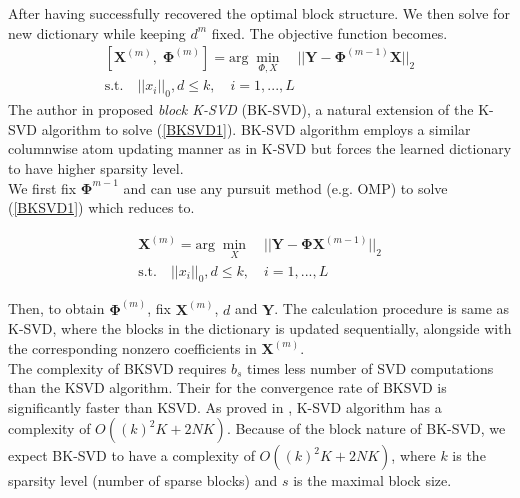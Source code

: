 After having successfully recovered the optimal block structure. We then solve for new dictionary while keeping $d^{m}$ fixed. The objective function becomes.
\begin{equation}
\begin{aligned}
    \left[\mathbf{X}^{(m)}, \;\mathbf{\Phi}^{(m)}\right] = \text{arg} \; \min_{\Phi,X} \quad || \mathbf{Y} - \mathbf{\Phi}^{(m-1)}\mathbf{X}||_2 \\
    \text{s.t.} \quad ||x_i||_0,d \leq k, \quad i = 1,...,L
\end{aligned}
\label{BKSVD1}
\end{equation}
The author in \cite{dictionary_block_sparse} proposed \textit{block K-SVD} (BK-SVD), a natural extension of the K-SVD algorithm to solve (\ref{BKSVD1}). BK-SVD algorithm employs a similar columnwise atom updating manner as in K-SVD but forces the learned dictionary to have higher sparsity level.\\

We first fix $\mathbf{\Phi}^{m-1}$ and can use any pursuit method (e.g. OMP) to solve (\ref{BKSVD1}) which reduces to.

\begin{equation}
\begin{aligned}
    \mathbf{X}^{(m)} = \text{arg} \; \min_X \quad || \mathbf{Y} - \mathbf{\Phi}\mathbf{X}^{(m-1)}||_2 \\
    \text{s.t.} \quad ||x_i||_0,d \leq k, \quad i = 1,...,L
\end{aligned}
\end{equation}

Then, to obtain $\mathbf{\Phi}^{(m)}$, fix $\mathbf{X}^{(m)}$, $d$ and $\mathbf{Y}$. The calculation procedure is same as K-SVD, where the blocks in the dictionary is updated sequentially, alongside with the corresponding nonzero coefficients in $\mathbf{X}^{(m)}$.\\

The complexity of BKSVD requires $b_s$ times less number of SVD computations than the KSVD algorithm. Their for the convergence rate of BKSVD is significantly faster than KSVD. As proved in \cite{OMP_KSVD}, K-SVD algorithm has a complexity of $O((k)^2K + 2NK)$. Because of the block nature of BK-SVD, we expect BK-SVD to have a complexity of $O((k)^2K + 2NK)$, where $k$ is the sparsity level (number of sparse blocks) and $s$ is the maximal block size.\\

